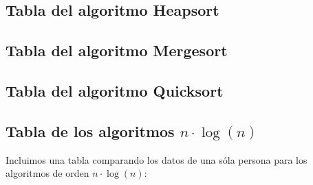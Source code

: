 \documentclass[a4paper, 11pt]{article}
\begin{document}
\subsection{Tabla del algoritmo Heapsort}

\subsection{Tabla del algoritmo Mergesort}

\subsection{Tabla del algoritmo Quicksort}


\newpage
\subsection{Tabla de los algoritmos $n\cdot \log(n)$}

\noindent Incluimos una tabla comparando los datos de una sóla persona para los algoritmos de orden $n\cdot \log(n)$: \\
\end{document}
